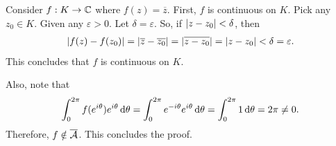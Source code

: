 \documentclass[12pt]{article}
\begin{document}
\begin{fproof}[5]
Consider \(f: K \to \mathbb {C}\) where \(f(z) = \overline{z}\).
First, \(f\) is continuous on \(K\).
Pick any \(z_0 \in K\).
Given any \(\varepsilon > 0\).
Let \(\delta = \varepsilon\).
So, if \(\left\lvert z - z_0 \right\rvert < \delta\),
then
\begin{align*}
    \left\lvert f(z) - f(z_0) \right\rvert = \left\lvert \overline{z} - \overline{z_0} \right\rvert = \left\lvert \overline{z - z_0} \right\rvert = \left\lvert z - z_0 \right\rvert < \delta = \varepsilon.
\end{align*}
This concludes that \(f\) is continuous on \(K\).

Also, note that
\begin{align*}
    \int_{0}^{2 \pi} f(e^{i \theta})e^{i \theta} \mathop{}\!\mathrm{d}\theta = \int_{0}^{2 \pi} e^{-i \theta} e^{i \theta} \mathop{}\!\mathrm{d}\theta = \int_{0}^{2 \pi} 1 \mathop{}\!\mathrm{d}\theta = 2 \pi \neq 0.
\end{align*}
Therefore, \(f \notin \overline{\mathcal{A}}\). This concludes the proof.
\end{fproof}
\end{document}
